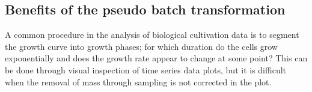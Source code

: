 \documentclass{bioinfo}
\begin{document}


\subsection{Benefits of the pseudo batch transformation}
A common procedure in the analysis of biological cultivation data is to segment the growth curve into growth phases; for which duration do the cells grow exponentially and does the growth rate appear to change at some point? This can be done through visual inspection of time series data plots, but it is difficult when the removal of mass through sampling is not corrected in the plot. 
\end{document}
